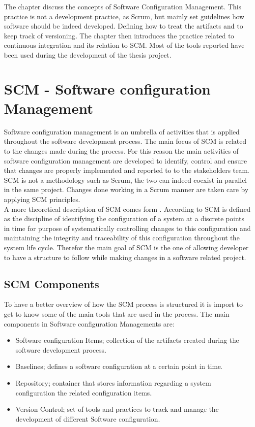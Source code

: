 \documentclass[../main.tex]{subfiles}
\begin{document}
The chapter discuss the concepts of Software Configuration Management. This practice is not a development practice, as Scrum, but mainly set guidelines how software should be indeed developed. Defining how to treat the artifacts and to keep track of versioning. The chapter then introduces the practice related to continuous integration and its relation to \gls{SCM}. Most of the tools reported have been used during the development of the thesis project.
\section{SCM - Software configuration Management}
Software configuration management is an umbrella of activities that is applied throughout the software development process. The main focus of \gls{SCM} is related to the changes made during the process. For this reason the main activities of software configuration management are developed to identify, control and ensure that changes are properly implemented and reported to to the stakeholders team.\\
\gls{SCM} is not a methodology such as Scrum, the two can indeed coexist in parallel in the same project. Changes done working in a Scrum manner are taken care by applying \gls{SCM} principles.\\
A more theoretical description of \gls{SCM} comes form \cite{10.1007/978-3-319-32467-8_110}. According to \citet{10.1007/978-3-319-32467-8_110} \gls{SCM} is defined as the discipline of identifying the configuration of a system at a discrete points in time for purpose of systematically controlling changes to this configuration and maintaining the integrity and traceability of this configuration throughout the system life cycle. Therefor the main goal of \gls{SCM} is the one of allowing developer to have a structure to follow while making changes in a software related project.
\subsection{SCM Components}
To have a better overview of how the \gls{SCM} process is structured it is import to get to know some of the main tools that are used in the process.  The main components in Software configuration Managements are:
\begin{itemize}
    \item Software configuration Items; collection of the artifacts created during the software development process. 
    \item Baselines; defines a software configuration at a certain point in time.
    \item Repository; container that stores information regarding a system configuration the related configuration items. 
    \item Version Control; set of tools and practices to track and manage the development of different Software configuration. 
\end{itemize}
\end{document}
